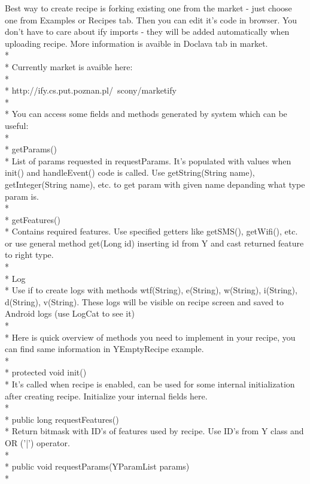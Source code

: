 \documentclass[11pt,a4paper,polish,thesis]{dcsbook}
\begin{document}
Best way to create recipe is forking existing one from the market - just choose one from Examples or Recipes tab. Then you can edit it's code in browser. You don't have to care about ify imports - they will be added automatically when uploading recipe. More information is avaible in Doclava tab in market. \\*\\*
Currently market is avaible here:\\*\\*
http://ify.cs.put.poznan.pl/~scony/marketify\\*\\*
You can access some fields and methods generated by system which can be useful:\\*\\*
getParams()\\*
List of params requested in requestParams. It's populated with values when init() and handleEvent() code is called. Use getString(String name), getInteger(String name), etc. to get param with given name depanding what type param is.\\*\\*
getFeatures()\\*
Contains required features. Use specified getters like getSMS(), getWifi(), etc. or use general method get(Long id) inserting id from Y and cast returned feature to right type.\\*\\*
Log\\*
Use if to create logs with methods wtf(String), e(String), w(String), i(String), d(String), v(String). These logs will be visible on recipe screen and saved to Android logs (use LogCat to see it)\\*\\*
Here is quick overview of methods you need to implement in your recipe, you can find same information in YEmptyRecipe example.\\*\\*
protected void init()\\*
It's called when recipe is enabled, can be used for some internal initialization after creating recipe. Initialize your internal fields here.\\*\\*
public long requestFeatures()\\*
Return bitmask with ID's of features used by recipe. Use ID's from Y class and OR ('|') operator.\\*\\*
public void requestParams(YParamList params)\\*
\end{document}

